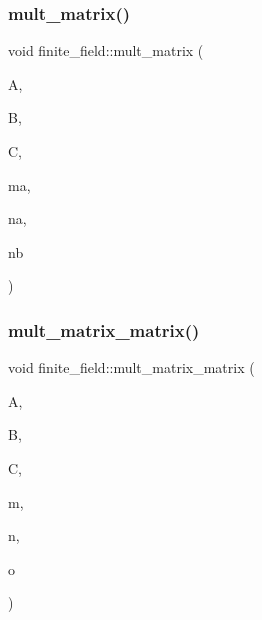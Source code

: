\mbox{\label{classfinite__field_a48517f15dfd7b21c37e0975855f1ada2}} 
\subsubsection{\texorpdfstring{mult\+\_\+matrix()}{mult\_matrix()}}
{\footnotesize\ttfamily void finite\+\_\+field\+::mult\+\_\+matrix (\begin{DoxyParamCaption}\item[{\mbox{\hyperlink{galois_8h_a09fddde158a3a20bd2dcadb609de11dc}{I\+NT}} $\ast$}]{A,  }\item[{\mbox{\hyperlink{galois_8h_a09fddde158a3a20bd2dcadb609de11dc}{I\+NT}} $\ast$}]{B,  }\item[{\mbox{\hyperlink{galois_8h_a09fddde158a3a20bd2dcadb609de11dc}{I\+NT}} $\ast$}]{C,  }\item[{\mbox{\hyperlink{galois_8h_a09fddde158a3a20bd2dcadb609de11dc}{I\+NT}}}]{ma,  }\item[{\mbox{\hyperlink{galois_8h_a09fddde158a3a20bd2dcadb609de11dc}{I\+NT}}}]{na,  }\item[{\mbox{\hyperlink{galois_8h_a09fddde158a3a20bd2dcadb609de11dc}{I\+NT}}}]{nb }\end{DoxyParamCaption})}

\mbox{\label{classfinite__field_a5e28706b815838d0ec34de1fa74bc3c4}} 
\subsubsection{\texorpdfstring{mult\+\_\+matrix\+\_\+matrix()}{mult\_matrix\_matrix()}}
{\footnotesize\ttfamily void finite\+\_\+field\+::mult\+\_\+matrix\+\_\+matrix (\begin{DoxyParamCaption}\item[{\mbox{\hyperlink{galois_8h_a09fddde158a3a20bd2dcadb609de11dc}{I\+NT}} $\ast$}]{A,  }\item[{\mbox{\hyperlink{galois_8h_a09fddde158a3a20bd2dcadb609de11dc}{I\+NT}} $\ast$}]{B,  }\item[{\mbox{\hyperlink{galois_8h_a09fddde158a3a20bd2dcadb609de11dc}{I\+NT}} $\ast$}]{C,  }\item[{\mbox{\hyperlink{galois_8h_a09fddde158a3a20bd2dcadb609de11dc}{I\+NT}}}]{m,  }\item[{\mbox{\hyperlink{galois_8h_a09fddde158a3a20bd2dcadb609de11dc}{I\+NT}}}]{n,  }\item[{\mbox{\hyperlink{galois_8h_a09fddde158a3a20bd2dcadb609de11dc}{I\+NT}}}]{o }\end{DoxyParamCaption})}

